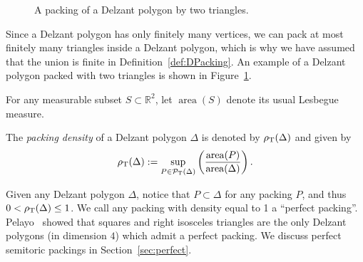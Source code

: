 \documentclass[pdftex]{sigma}
\numberwithin{equation}{section}
\newcommand{\triangleline}{dashed}
\def\R{{\mathbb R}}
\newcommand{\De}{\Delta}
\newcommand{\area}{\operatorname{area}}
\newcommand{\PT}{\mathcal{P}_{\rm T}}
\begin{document}
 \begin{figure}%
 \centering
 \caption{A packing of a Delzant polygon by two triangles.}
 \label{fig:delz_pack}
 \end{figure}


Since a Delzant polygon has only finitely many vertices, we can pack at most finitely many triangles inside a Delzant polygon, which is why we have assumed that the union is finite in Definition~\ref{def:DPacking}.
An example of a Delzant polygon packed with two triangles is shown in Figure~\ref{fig:delz_pack}.





For any measurable subset $S\subset \R^2$, let $\area(S)$ denote its usual Lesbegue measure.



\begin{Definition}\label{def:toric-density}
The \emph{packing density} of a Delzant polygon $\De$ is denoted by $\rho_{{\rm T}}(\De)$ and given by
\[
 \rho_{{\rm T}}(\De): = \sup_{P \in \PT(\De)}\left( \frac{\area(P)}{\area(\De)}\right).
\]
\end{Definition}

Given any Delzant polygon $\De$, notice that $P\subset \De$ for any packing $P$, and thus $0<\rho_{{\rm T}}(\De)\leq 1$.
We call any packing with density equal to 1 a ``perfect packing''. Pelayo~\cite{Pe2006} showed that squares and right isosceles triangles are the only Delzant polygons (in dimension $4$) which admit a perfect packing.
We discuss perfect semitoric packings in Section~\ref{sec:perfect}.
\end{document}
